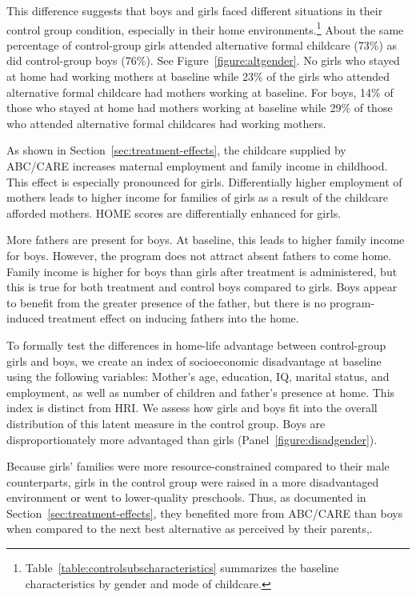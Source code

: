 This difference suggests that boys and girls faced different situations in their control group condition, especially in their home environments.\footnote{Table~\ref{table:controlsubscharacteristics} summarizes the baseline characteristics by gender and mode of childcare.} About the same percentage of control-group girls attended alternative formal childcare (73\%) as did control-group boys (76\%). See Figure~\ref{figure:altgender}. No girls who stayed at home had working mothers at baseline while 23\% of the girls who attended alternative formal childcare had mothers working at baseline. For boys, 14\% of those who stayed at home had mothers working at baseline while 29\% of those who attended alternative formal childcares had working mothers.

As shown in Section~\ref{sec:treatment-effects}, the childcare supplied by ABC/CARE increases maternal employment and family income in childhood. This effect is especially pronounced for girls. Differentially higher employment of mothers leads to higher income for families of girls as a result of the childcare afforded mothers. HOME scores are differentially enhanced for girls.

More fathers are present for boys. At baseline, this leads to higher family income for boys. However, the program does not attract absent fathers to come home. Family income is higher for boys than girls after treatment is administered, but this is true for both treatment and control boys compared to girls. Boys appear to benefit from the greater presence of the father, but there is no program-induced treatment effect on inducing fathers into the home.

To formally test the differences in home-life advantage between control-group girls and boys, we create an index of socioeconomic disadvantage at baseline using the following variables: Mother's age, education, IQ, marital status, and employment, as well as number of children and father's presence at home. This index is distinct from HRI. We assess how girls and boys fit into the overall distribution of this latent measure in the control group. Boys are disproportionately more advantaged than girls (Panel~\ref{figure:disadgender}).

Because girls' families were more resource-constrained compared to their male counterparts, girls in the control group were raised in a more disadvantaged environment or went to lower-quality preschools. Thus, as documented in Section~\ref{sec:treatment-effects}, they benefited more from ABC/CARE than boys when compared to the next best alternative as perceived by their parents,.

